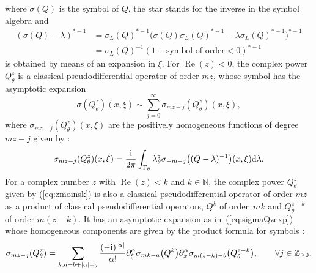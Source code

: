 \documentclass[10pt,a4paper]{amsart}
\numberwithin{equation}{section}
\theoremstyle{definition}
\newcommand{\Z}{\mathbb Z}
\newcommand{\N}{\mathbb N}
\begin{document}
where $\sigma(Q)$ is the symbol of $Q$, the star stands for the inverse in the symbol algebra and
\begin{align*}
(\sigma(Q)-\lambda)^{*-1}&{}= \sigma_L(Q)^{*-1} \bigl(\sigma(Q)\sigma_L(Q)^{*-1} -\lambda \sigma_L(Q)^{*-1} \bigr)^{*-1}\\
&{}=\sigma_L(Q)^{-1} (1+\text{symbol of order} <0)^{*-1}
\end{align*}
is obtained by means of an expansion in $\xi$.
For $\operatorname{Re}(z)<0$, the complex power $Q_\theta^z$ is a classical pseudodifferential operator of order $mz$, whose symbol has the asymptotic expansion
\begin{equation} \label{eq:sigmaQzexp}\sigma(Q_\theta^z)(x,\xi)\sim \sum_{j=0}^\infty\sigma_{mz-j}(Q_\theta^z)(x,\xi),\end{equation}
where $\sigma_{mz-j}(Q_\theta^z)(x,\xi)$ are the positively homogeneous functions of degree $mz-j$ given by {\cite[formula (4.8.2.7)]{Sc}:
\begin{equation}\label{eq:symbolqz}
\sigma_{mz-j}(Q_\theta^z)(x,\xi)=\frac{{\rm i}}{2\pi}\int_{\Gamma_\theta}\lambda_\theta^z\sigma_{-m-j}\bigl((Q-\lambda)^{-1}\bigr)(x,\xi) {\rm d}\lambda.
\end{equation}
For a complex number $z$ with $\operatorname{Re}(z)<k$ and $k\in \N$, the complex power $Q_\theta^z$ given by (\ref{eq:zmoinsk}) is also a classical pseudodifferential operator of order $mz$ as a product of classical pseudodifferential operators, $Q^k$ of order~$mk$ and $Q_\theta^{z-k}$ of order $m(z-k)$. It has an asymptotic expansion as in~(\ref{eq:sigmaQzexp}) whose homogeneous components are given by the product formula for symbols \cite[formula~(10.16)]{Sh}: \begin{equation}\label{sigmajzk}
\sigma_{mz-j}(Q_\theta^z)= \sum_{k,a+b+\vert \alpha\vert=j} \frac{(-{\rm i})^{\vert \alpha \vert}}{\alpha!} \partial_\xi^\alpha \sigma_{mk-a} \bigl(Q^k\bigr) \partial_x^\alpha\sigma_{m(z-k)-b}\bigl(Q_\theta^{z-k}\bigr),\qquad \forall j\in \Z_{\geq 0}. 	\end{equation} }
	
\end{document}
